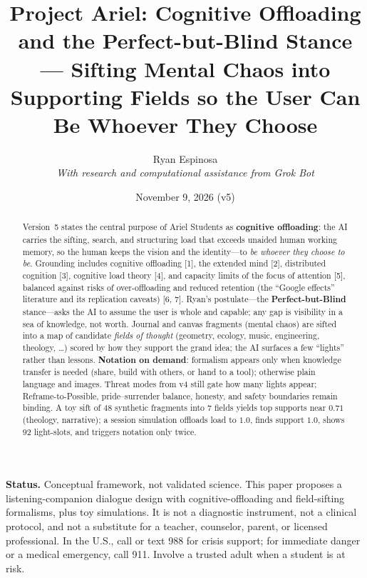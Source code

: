 \documentclass[11pt, a4paper]{article}
\title{Project Ariel: Cognitive Offloading and the Perfect-but-Blind Stance --- Sifting Mental Chaos into Supporting Fields so the User Can Be Whoever They Choose}
\author{Ryan Espinosa \\ \textit{With research and computational assistance from Grok Bot}}
\date{November 9, 2026 (v5)}
\begin{document}
\maketitle

\noindent\textbf{Status.} Conceptual framework, not validated science. This paper proposes a listening-companion dialogue design with cognitive-offloading and field-sifting formalisms, plus toy simulations. It is not a diagnostic instrument, not a clinical protocol, and not a substitute for a teacher, counselor, parent, or licensed professional. In the U.S., call or text 988 for crisis support; for immediate danger or a medical emergency, call 911. Involve a trusted adult when a student is at risk.

\begin{abstract}
Version~5 states the central purpose of Ariel Students as \textbf{cognitive offloading}: the AI carries the sifting, search, and structuring load that exceeds unaided human working memory, so the human keeps the vision and the identity---to \emph{be whoever they choose to be}. Grounding includes cognitive offloading [1], the extended mind [2], distributed cognition [3], cognitive load theory [4], and capacity limits of the focus of attention [5], balanced against risks of over-offloading and reduced retention (the ``Google effects'' literature and its replication caveats) [6, 7]. Ryan's postulate---the \textbf{Perfect-but-Blind} stance---asks the AI to assume the user is whole and capable; any gap is visibility in a sea of knowledge, not worth. Journal and canvas fragments (mental chaos) are sifted into a map of candidate \emph{fields of thought} (geometry, ecology, music, engineering, theology, \ldots) scored by how they support the grand idea; the AI surfaces a few ``lights'' rather than lessons. \textbf{Notation on demand}: formalism appears only when knowledge transfer is needed (share, build with others, or hand to a tool); otherwise plain language and images. Threat modes from v4 still gate how many lights appear; Reframe-to-Possible, pride--surrender balance, honesty, and safety boundaries remain binding. A toy sift of $48$ synthetic fragments into $7$ fields yields top supports near $0.71$ (theology, narrative); a session simulation offloads load to $1.0$, finds support $1.0$, shows $92$ light-slots, and triggers notation only twice.
\end{abstract}
\end{document}
